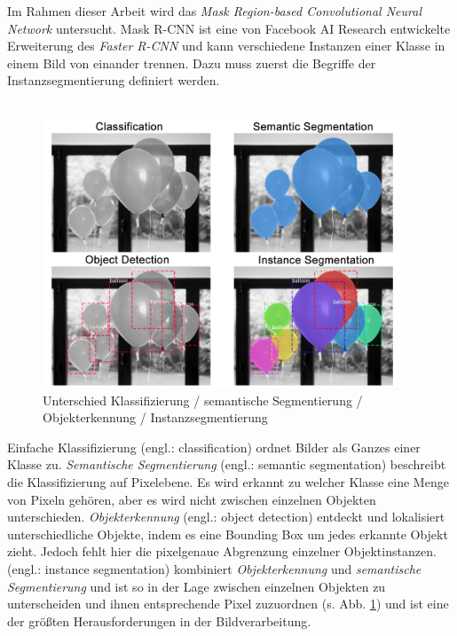 Im Rahmen dieser Arbeit wird das \textit{Mask Region-based Convolutional Neural Network} untersucht. Mask R-CNN ist eine von Facebook AI Research entwickelte Erweiterung des \textit{Faster R-CNN} und kann verschiedene Instanzen einer Klasse in einem Bild von einander trennen. Dazu muss zuerst die Begriffe der Instanzsegmentierung definiert werden.
\\\\
\begin{figure}[ht]
  \centering
  \includegraphics[width=0.95\textwidth]{pics/instance-segmentation.png}
  \caption[Instanzsegmentierung]{Unterschied Klassifizierung / semantische Segmentierung / Objekterkennung / Instanzsegmentierung\cite{ref:matterport:maskrcnn}}
  \label{fig:instance-segmentation}
\end{figure}
\noindent
Einfache Klassifizierung (engl.: classification) ordnet Bilder als Ganzes einer Klasse zu. \textit{Semantische Segmentierung} (engl.: semantic segmentation) beschreibt die Klassifizierung auf Pixelebene. Es wird erkannt zu welcher Klasse eine Menge von Pixeln gehören, aber es wird nicht zwischen einzelnen Objekten unterschieden. \textit{Objekterkennung} (engl.: object detection) entdeckt und lokalisiert unterschiedliche Objekte, indem es eine Bounding Box um jedes erkannte Objekt zieht. Jedoch fehlt hier die pixelgenaue Abgrenzung einzelner Objektinstanzen.  (engl.: instance segmentation) kombiniert \textit{Objekterkennung} und \textit{semantische Segmentierung} und ist so in der Lage zwischen einzelnen Objekten zu unterscheiden und ihnen entsprechende Pixel zuzuordnen (s. Abb. \ref{fig:instance-segmentation}) und ist eine der größten Herausforderungen in der Bildverarbeitung.\cite{ref:maskrcnn}
